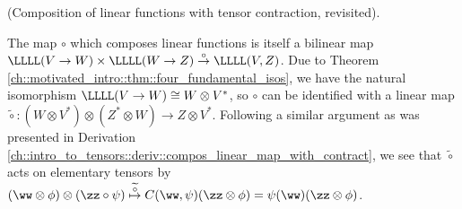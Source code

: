 \begin{remark}
    (Composition of linear functions with tensor contraction, revisited). 
    
    The map $\circ$ which composes linear functions is itself a bilinear map ${\LLLL(V \rightarrow W) \times \LLLL(W \rightarrow Z) \overset{\circ}{\rightarrow} \LLLL(V, Z)}$. Due to Theorem \ref{ch::motivated_intro::thm::four_fundamental_isos}, we have the natural isomorphism $\LLLL(V \rightarrow W) \cong W \otimes V^*$, so $\circ$ can be identified with a linear map $\widetilde{\circ}:(W \otimes V^*) \otimes (Z^* \otimes W) \rightarrow Z \otimes V^*$. Following a similar argument as was presented in Derivation \ref{ch::intro_to_tensors::deriv::compos_linear_map_with_contract}, we see that $\widetilde{\circ}$ acts on elementary tensors by $(\ww \otimes \phi) \otimes (\zz \circ \psi) \overset{\widetilde{\circ}}{\mapsto} C(\ww, \psi) (\zz \otimes \phi) = \psi(\ww) (\zz \otimes \phi)$.
\end{remark}

